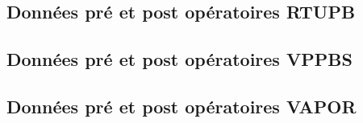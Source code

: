 \subsection{Données pré et post opératoires RTUPB}







\subsection{Données pré et post opératoires VPPBS }



\subsection{Données pré et post opératoires VAPOR}